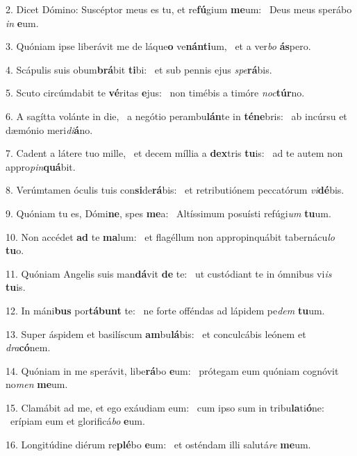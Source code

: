 2. Dicet Dómino: Suscéptor meus es tu, et re\textbf{fú}gium \textbf{me}um: \ast\  Deus meus sperábo \textit{in} \textbf{e}um.\

3. Quóniam ipse liberávit me de láque\textbf{o} ve\textbf{nán}\textbf{ti}um, \ast\  et a ver\textit{bo} \textbf{ás}pero.\

4. Scápulis suis obum\textbf{brá}bit \textbf{ti}bi: \ast\  et sub pennis ejus \textit{spe}\textbf{rá}bis.\

5. Scuto circúmdabit te \textbf{vé}ritas \textbf{e}jus: \ast\  non timébis a timóre \textit{noc}\textbf{túr}no.\

6. A sagítta volánte in die, \dag\  a negótio perambu\textbf{lán}te in \textbf{té}\textbf{ne}bris: \ast\  ab incúrsu et dæmónio meri\textit{di}\textbf{á}no.\

7. Cadent a látere tuo mille, \dag\  et decem míllia a \textbf{dex}tris \textbf{tu}is: \ast\  ad te autem non appro\textit{pin}\textbf{quá}bit.\

8. Verúmtamen óculis tuis con\textbf{si}de\textbf{rá}bis: \ast\  et retributiónem peccatórum \textit{vi}\textbf{dé}bis.\

9. Quóniam tu es, Dómi\textbf{ne}, spes \textbf{me}a: \ast\  Altíssimum posuísti refúgi\textit{um} \textbf{tu}um.\

10. Non accédet \textbf{ad} te \textbf{ma}lum: \ast\  et flagéllum non appropinquábit tabernácu\textit{lo} \textbf{tu}o.\

11. Quóniam Angelis suis man\textbf{dá}vit \textbf{de} te: \ast\  ut custódiant te in ómnibus vi\textit{is} \textbf{tu}is.\

12. In máni\textbf{bus} por\textbf{tá}\textbf{bunt} te: \ast\  ne forte offéndas ad lápidem pe\textit{dem} \textbf{tu}um.\

13. Super áspidem et basilíscum \textbf{am}bu\textbf{lá}bis: \ast\  et conculcábis leónem et \textit{dra}\textbf{có}nem.\

14. Quóniam in me sperávit, libe\textbf{rá}bo \textbf{e}um: \ast\  prótegam eum quóniam cognóvit no\textit{men} \textbf{me}um.\

15. Clamábit ad me, et ego exáudiam eum: \dag\  cum ipso sum in tribu\textbf{la}ti\textbf{ó}ne: \ast\  erípiam eum et glorificá\textit{bo} \textbf{e}um.\

16. Longitúdine diérum re\textbf{plé}bo \textbf{e}um: \ast\  et osténdam illi salutá\textit{re} \textbf{me}um.\

